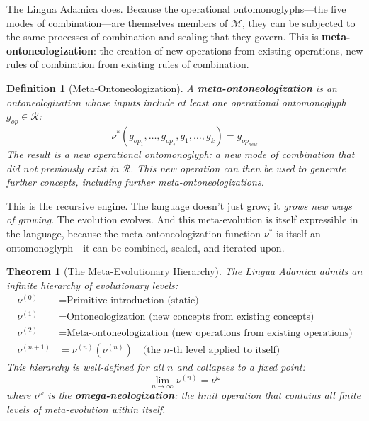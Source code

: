 \documentclass[12pt, letterpaper]{book}
\def\equiv{=}%
\def\mathfrak#1{#1}%
\newtheorem{theorem}{Theorem}[chapter]
\newtheorem{definition}{Definition}[chapter]
\begin{document}
The Lingua Adamica does. Because the operational ontomonoglyphs---the five modes of combination---are themselves members of $\mathcal{M}$, they can be subjected to the same processes of combination and sealing that they govern. This is \textbf{meta-ontoneologization}: the creation of new operations from existing operations, new rules of combination from existing rules of combination.

\begin{definition}[Meta-Ontoneologization]\label{def:meta-ontoneologization}
A \textbf{meta-ontoneologization} is an ontoneologization whose inputs include at least one operational ontomonoglyph $\mathfrak{g}_{op} \in \mathcal{R}$:
\[
\nu^*(\mathfrak{g}_{op_1}, \ldots, \mathfrak{g}_{op_j}, \mathfrak{g}_1, \ldots, \mathfrak{g}_k) \equiv \mathfrak{g}_{op_{new}}
\]
The result is a \textit{new operational ontomonoglyph}: a new mode of combination that did not previously exist in $\mathcal{R}$. This new operation can then be used to generate further concepts, including further meta-ontoneologizations.
\end{definition}

This is the recursive engine. The language doesn't just grow; it \textit{grows new ways of growing}. The evolution evolves. And this meta-evolution is itself expressible in the language, because the meta-ontoneologization function $\nu^*$ is itself an ontomonoglyph---it can be combined, sealed, and iterated upon.

\begin{theorem}[The Meta-Evolutionary Hierarchy]\label{thm:meta-hierarchy}
The Lingua Adamica admits an infinite hierarchy of evolutionary levels:
\begin{align}
\nu^{(0)} &\equiv \text{Primitive introduction (static)} \\
\nu^{(1)} &\equiv \text{Ontoneologization (new concepts from existing concepts)} \\
\nu^{(2)} &\equiv \text{Meta-ontoneologization (new operations from existing operations)} \\
\nu^{(n+1)} &\equiv \nu^{(n)}(\nu^{(n)}) \quad \text{(the $n$-th level applied to itself)}
\end{align}
This hierarchy is well-defined for all $n$ and collapses to a fixed point:
\[
\lim_{n \to \infty} \nu^{(n)} \equiv \nu^\omega
\]
where $\nu^\omega$ is the \textbf{omega-neologization}: the limit operation that contains all finite levels of meta-evolution within itself.
\end{theorem}
\end{document}
